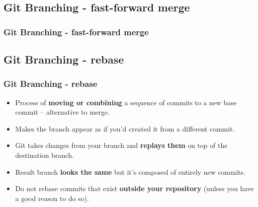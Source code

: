 \subsection[]{Git Branching - fast-forward merge}
\begin{frame}
\frametitle{Git Branching - fast-forward merge}
\end{frame}

\subsection[]{Git Branching - rebase}
\begin{frame}
\frametitle{Git Branching - rebase}
\begin{itemize}
	\item Process of \textbf{moving or combining} a sequence of commits to a new base commit – alternative to merge.
	\item Makes the branch appear as if you'd created it from a different commit.
	\item Git takes changes from your branch and \textbf{replays them} on top of the destination branch.
	\item Result branch \textbf{looks the same} but it's composed of entirely new commits.
	\item Do not rebase commits that exist \textbf{outside your repository} (unless you have a good reason to do so).
\end{itemize}
\end{frame}

